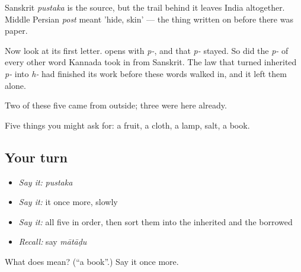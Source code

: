 Sanskrit \emph{pustaka} is the source, but the trail behind it leaves India altogether. Middle Persian \emph{post} meant 'hide, skin' — the thing written on before there was paper.

Now look at its first letter.  opens with \emph{p-}, and that \emph{p-} stayed. So did the \emph{p-} of every other word Kannada took in from Sanskrit. The law that turned inherited \emph{p-} into \emph{h-} had finished its work before these words walked in, and it left them alone.

Two of these five came from outside; three were here already.

\begin{grammarlens}[title={What you've built}]
Five things you might ask for: a fruit, a cloth, a lamp, salt, a book.
\end{grammarlens}

\subsection*{Your turn}
\begin{itemize}
\raggedright
  \item \emph{Say it:} \emph{pustaka}
  \item \emph{Say it:} it once more, slowly
  \item \emph{Say it:} all five in order, then sort them into the inherited and the borrowed
  \item \emph{Recall:} say \emph{mātāḍu}
\end{itemize}

\begin{tcolorbox}[breakable,colback=teal!4,colframe=teal!35!black,title={Before you move on}]
What does  mean? (\textquotedblleft{}a book\textquotedblright{}.) Say it once more.
\end{tcolorbox}
